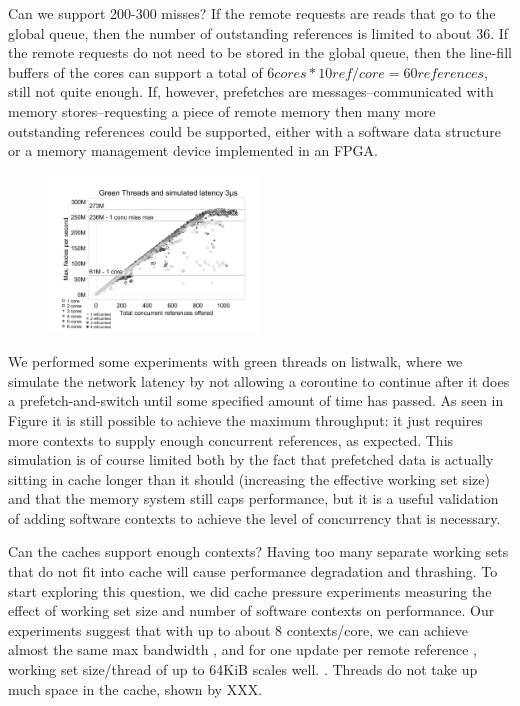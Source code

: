 	Can we support 200-300 misses? If the remote requests are reads that go to the global queue, then the number of outstanding references is limited to about 36. If the remote requests do not need to be stored in the global queue, then the line-fill buffers of the cores can support a total of $6 cores * 10 ref/core = 60 references$, still not quite enough. If, however, prefetches are messages--communicated with memory stores--requesting a piece of remote memory then many more outstanding references could be supported, either with a software data structure or a memory management device implemented in an FPGA.
	\begin{figure}[h]
	\begin{center}
 		\includegraphics[width=0.5\textwidth]{figures/multi-green-delay7800-edited.pdf}
	\end{center}
	\caption{}
	\label{fig:listwalk-green-delay}
\end{figure}
	We performed some experiments with green threads on listwalk, where we simulate the network latency by not allowing a coroutine to continue after it does a prefetch-and-switch until some specified amount of time has passed.  As seen in Figure  it is still possible to achieve the maximum throughput: it just requires more contexts to supply enough concurrent references, as expected. This simulation is of course limited both by the fact that prefetched data is actually sitting in cache longer than it should (increasing the effective working set size) and that the memory system still caps performance, but it is a useful validation of adding software contexts to achieve the level of concurrency that is necessary.
	
	Can the caches support enough contexts? Having too many separate working sets that do not fit into cache will cause performance degradation and thrashing. To start exploring this question, we did cache pressure experiments measuring the effect of working set size and number of software contexts on performance.  Our experiments suggest that with up to about 8 contexts/core, we can achieve almost the same max bandwidth , and for one update per remote reference , working set size/thread of up to 64KiB scales well. .  Threads do not take up much space in the cache, shown by XXX.


